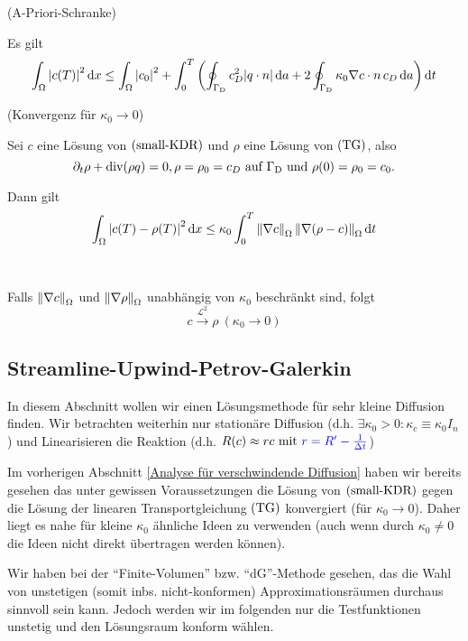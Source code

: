 \begin{Lemma}(A-Priori-Schranke)
	
	Es gilt
	\begin{align*}
		\int_\Omega \abs{c(T)}^2 \mathop{}\!\mathrm{d} x \leq \int_\Omega \abs{c_0}^2 + \int_{0}^{T} \left( \oint_{\Gamma_{\text{D}}} c_D^2 \abs{q \cdot n} \mathop{}\!\mathrm{d} a + 2 \oint_{\Gamma_{\text{D}}} \kappa_0 \nabla c \cdot n \, c_D \mathop{}\!\mathrm{d} a\right) \mathop{}\!\mathrm{d} t
	\end{align*}
\end{Lemma}

\begin{Lemma}(Konvergenz für $ \kappa_0 \to 0 $)
	
	Sei $ c $ eine Lösung von $ \operatorname{(small-KDR)} $ und $ \rho $ eine Lösung von $ \operatorname{(TG)} $, also 
	\[ \partial_t \rho + \operatorname{div}(\rho q) = 0, \rho = \rho_0 = c_D \text{ auf } \Gamma_{\text{D}} \text{ und }  \rho(0) = \rho_0 = c_0.  \]
	
	Dann gilt 
	\[ \int_\Omega \abs{c(T) - \rho(T)}^2 \mathop{}\!\mathrm{d} x \leq \kappa_0 \int_{0}^{T} \norm{\nabla c}_\Omega\, \norm{\nabla(\rho - c)}_\Omega \mathop{}\!\mathrm{d} t \]
\end{Lemma}

\begin{Korollar}~
	
	Falls $ \norm{\nabla c}_\Omega $ und $ \norm{\nabla \rho}_\Omega $ unabhängig von $ \kappa_0 $ beschränkt sind, folgt
	\[ c \stackrel{\mathcal{L}^2}{\to} \rho \ (\kappa_0 \to 0) \]
\end{Korollar}

\subsection{Streamline-Upwind-Petrov-Galerkin}
In diesem Abschnitt wollen wir einen Lösungsmethode für sehr kleine Diffusion finden. Wir betrachten weiterhin nur stationäre Diffusion (d.h. $ \exists \kappa_0 > 0: \kappa_c \equiv \kappa_0 I_n $) und Linearisieren die Reaktion (d.h. $ R(c) \approx r c \text{ mit } \textcolor{blue}{r =  R' - \frac{1}{\Delta t}}$)

Im vorherigen Abschnitt \ref{Analyse für verschwindende Diffusion} haben wir bereits gesehen das unter gewissen Voraussetzungen die Lösung von $ \operatorname{(small-KDR)} $ gegen die Lösung der linearen Transportgleichung $ \operatorname{(TG)} $ konvergiert (für $ \kappa_0 \to 0 $). Daher liegt es nahe für kleine $ \kappa_0  $ ähnliche Ideen zu verwenden (auch wenn durch $ \kappa_0 \neq 0 $ die Ideen nicht direkt übertragen werden können).

Wir haben bei der \enquote{Finite-Volumen} bzw. \enquote{dG}-Methode gesehen, das die Wahl von unstetigen (somit inbs. nicht-konformen) Approximationsräumen durchaus sinnvoll sein kann. Jedoch werden wir im folgenden nur die Testfunktionen unstetig und den Lösungsraum konform wählen.

